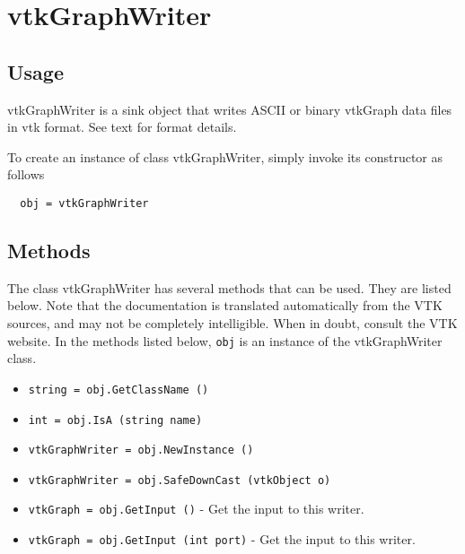 \section{vtkGraphWriter}

\subsection{Usage}

 vtkGraphWriter is a sink object that writes ASCII or binary 
 vtkGraph data files in vtk format. See text for format details.

To create an instance of class vtkGraphWriter, simply
invoke its constructor as follows
\begin{verbatim}
  obj = vtkGraphWriter
\end{verbatim}
\subsection{Methods}

The class vtkGraphWriter has several methods that can be used.
  They are listed below.
Note that the documentation is translated automatically from the VTK sources,
and may not be completely intelligible.  When in doubt, consult the VTK website.
In the methods listed below, \verb|obj| is an instance of the vtkGraphWriter class.
\begin{itemize}
\item  \verb|string = obj.GetClassName ()|

\item  \verb|int = obj.IsA (string name)|

\item  \verb|vtkGraphWriter = obj.NewInstance ()|

\item  \verb|vtkGraphWriter = obj.SafeDownCast (vtkObject o)|

\item  \verb|vtkGraph = obj.GetInput ()| -  Get the input to this writer.

\item  \verb|vtkGraph = obj.GetInput (int port)| -  Get the input to this writer.

\end{itemize}
